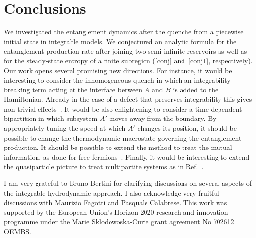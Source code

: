 \documentclass[twocolumn,superscriptaddress,prb,10pt]{revtex4-1}
\begin{document}
\section{Conclusions} We investigated the entanglement dynamics after the  
quenche from a piecewise initial state in integrable models. We conjectured an analytic formula for the 
entanglement production rate after joining two semi-infinite reservoirs as well as 
for the steady-state entropy of a finite subregion (\eqref{conj} and~\eqref{conj1}, 
respectively). Our work opens several promising 
new directions. 
For instance,  
it would be interesting to consider the inhomogeneous quench in which an 
integrability-breaking term acting at the interface between $A$ and $B$ is added to the Hamiltonian. 
Already in the case of a defect that preserves integrability this gives non trivial effects~\cite{bertini-2016}. 
It would be also 
enlightening to consider a time-dependent bipartition in which subsystem $A'$ moves away 
from the boundary. By appropriately tuning the speed at which $A'$ changes its position, 
it should be possible to change the thermodynamic macrostate  
governing the entanglement production. It should be possible to extend the 
method to treat the mutual information, as done for free fermions~\cite{eisler-2014,kormos-2017a}. 
Finally, it would be interesting to extend the quasiparticle picture to treat 
multipartite systems as in Ref.~\cite{savona}. 



\begin{acknowledgments}
I am very grateful to Bruno Bertini for clarifying 
discussions on several aspects of the integrable hydrodynamic approach. I also acknowledge very fruitful discussions with 
Maurizio Fagotti and Pasquale Calabrese. This work was supported by the European  
Union's  Horizon  2020  research  and  innovation  programme under the Marie 
Sklodowoska-Curie grant agreement No 702612 OEMBS. 
\end{acknowledgments}

\appendix
\end{document}
